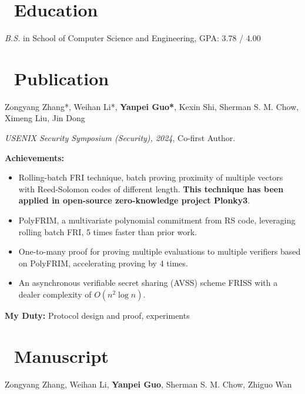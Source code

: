 \documentclass{resume}
\begin{document}



\section{\faGraduationCap\ Education}
\textit{B.S.} in School of Computer Science and Engineering, GPA: 3.78 / 4.00

\section{\faBook\ Publication}

Zongyang Zhang*, Weihan Li*, \textbf{Yanpei Guo*}, Kexin Shi, Sherman S. M. Chow, Ximeng Liu, Jin Dong

\textit{USENIX Security Symposium (Security), 2024}, Co-first Author.

\textbf{Achievements:}
\begin{itemize}
  \item Rolling-batch FRI technique, batch proving proximity of multiple vectors with Reed-Solomon codes of different length. 
  \textbf{This technique has been applied in open-source zero-knowledge project Plonky3}.
  \item PolyFRIM, a multivariate polynomial commitment from RS code, leveraging rolling batch FRI, 5 times faster than prior work.
  \item One-to-many proof for proving multiple evaluations to multiple verifiers based on PolyFRIM, accelerating proving by 4 times.
  \item An asynchronous verifiable secret sharing (AVSS) scheme FRISS with a dealer complexity of $O(n^2 \log n)$. 
\end{itemize}
\textbf{My Duty:} Protocol design and proof, experiments

\section{\faBookmark\ Manuscript}

Zongyang Zhang, Weihan Li, \textbf{Yanpei Guo}, Sherman S. M. Chow, Zhiguo Wan
\end{document}

